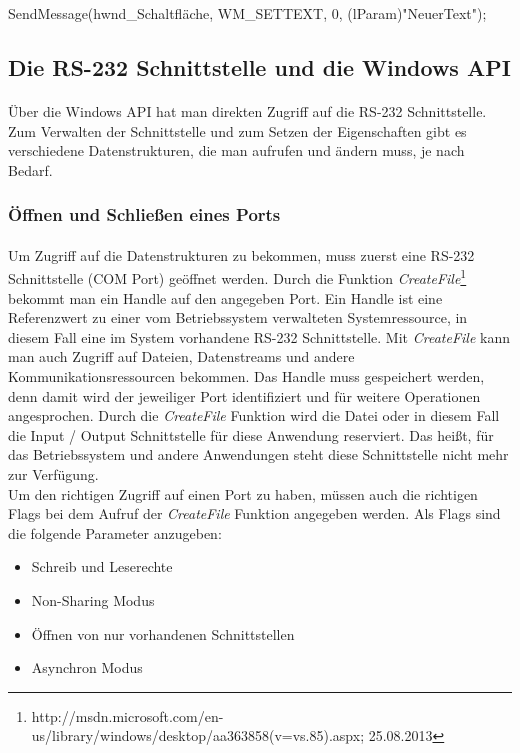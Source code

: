 \begin{center}
SendMessage(hwnd\_Schaltfläche, WM\_SETTEXT, 0, (lParam)"NeuerText");
\end{center}

\subsection{Die RS-232 Schnittstelle und die Windows API}\label{COMWINAPI}
\paragraph{}
Über die Windows API hat man direkten Zugriff auf die RS-232 Schnittstelle. Zum Verwalten der Schnittstelle und zum Setzen der Eigenschaften gibt es verschiedene Datenstrukturen, die man aufrufen und ändern muss, je nach Bedarf.

\subsubsection{Öffnen und Schließen eines Ports}
\paragraph{}
Um Zugriff auf die Datenstrukturen zu bekommen, muss zuerst eine RS-232 Schnittstelle (COM Port) geöffnet werden. Durch die Funktion \textit{CreateFile}\footnote{http://msdn.microsoft.com/en-us/library/windows/desktop/aa363858(v=vs.85).aspx; 25.08.2013} bekommt man ein Handle auf den angegeben Port. Ein Handle ist eine Referenzwert zu einer vom Betriebssystem verwalteten Systemressource, in diesem Fall eine im System vorhandene RS-232 Schnittstelle. Mit \textit{CreateFile} kann man auch Zugriff auf Dateien, Datenstreams und andere Kommunikationsressourcen bekommen. Das Handle muss gespeichert werden, denn damit wird der jeweiliger Port identifiziert und für weitere Operationen angesprochen. Durch die \textit{CreateFile} Funktion wird die Datei oder in diesem Fall die Input / Output Schnittstelle für diese Anwendung reserviert. Das heißt, für das Betriebssystem und andere Anwendungen steht diese Schnittstelle nicht mehr zur Verfügung.
\\

Um den richtigen Zugriff auf einen Port zu haben, müssen auch die richtigen Flags bei dem Aufruf der \textit{CreateFile} Funktion angegeben werden. Als Flags sind die folgende Parameter anzugeben:
\begin{itemize}
\item Schreib und Leserechte
\item Non-Sharing Modus
\item Öffnen von nur vorhandenen Schnittstellen
\item Asynchron Modus
\end{itemize}

